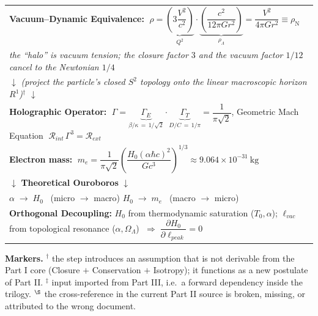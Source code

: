 \begin{tcolorbox}[colback=gray!5, colframe=black!80!black,
                  title=Derivation Chain Map --- WILL RG II (B): Stage II and Closure]
\begin{center}
\begin{tabular}{|>{\centering\arraybackslash}p{}|}
\textbf{Vacuum--Dynamic Equivalence:} $\;\rho=\underbrace{\left(3\dfrac{V^{2}}{c^{2}}\right)}_{Q^{2}}\cdot
\underbrace{\left(\dfrac{c^{2}}{12\pi Gr^{2}}\right)}_{\rho_{\Lambda}}
=\dfrac{V^{2}}{4\pi Gr^{2}}\equiv\boxed{\rho_{\mathrm{N}}}$\\[2pt]
\textit{the ``halo'' is vacuum tension; the closure factor $3$ and the vacuum factor $1/12$ cancel to the Newtonian $1/4$}\\[8pt]\hline
$\downarrow$ \textit{(project the particle's closed $S^{2}$ topology onto the linear macroscopic horizon $R^{1}$)}$^{\dagger}$ $\downarrow$\\\hline
\textbf{Holographic Operator:} $\;\Gamma=\underbrace{\Gamma_{E}}_{\beta/\kappa\,=\,1/\sqrt{2}}\cdot
\underbrace{\Gamma_{T}}_{D/C\,=\,1/\pi}=\dfrac{1}{\pi\sqrt{2}}$, \qquad
Geometric Mach Equation $\;\boxed{\mathcal{R}_{int}\,\Gamma^{3}=\mathcal{R}_{ext}}$\\[8pt]\hline
\textbf{Electron mass:} $\;\boxed{m_{e}=\dfrac{1}{\pi\sqrt{2}}
\left(\dfrac{H_{0}(\alpha\hbar c)^{2}}{Gc^{3}}\right)^{1/3}}\approx9.064\times10^{-31}\ \mathrm{kg}$\\[8pt]\hline

$\downarrow$ \textbf{Theoretical Ouroboros} $\downarrow$\\\hline
$\boxed{\alpha\;\longrightarrow\;H_{0}}$ \ (micro $\to$ macro) \qquad
$\boxed{H_{0}\;\longrightarrow\;m_{e}}$ \ (macro $\to$ micro)\\[4pt]\hline
\textbf{Orthogonal Decoupling:} $H_{0}$ from thermodynamic saturation ($T_{0},\alpha$);
$\ell_{vac}$ from topological resonance ($\alpha,\Omega_{\Lambda}$)
$\;\Longrightarrow\;\boxed{\dfrac{\partial H_{0}}{\partial\ell_{peak}}=0}$\\[6pt]\hline

\end{tabular}
\end{center}

\vspace{2pt}
{\footnotesize
\textbf{Markers.}
$^{\dagger}$ the step introduces an assumption that is not derivable from the Part I core
(Closure $+$ Conservation $+$ Isotropy); it functions as a new postulate of Part II.
$^{\ddagger}$ input imported from Part III, i.e.\ a forward dependency inside the trilogy.
$^{\S}$ the cross-reference in the current Part II source is broken, missing, or attributed
to the wrong document.}
\end{tcolorbox}
